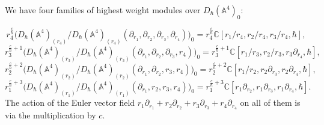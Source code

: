 \documentclass[12pt]{amsart}
\begin{document}
     
    We have four families of highest weight modules over $D_{\hbar}(\mathbb{A}^4)_0$:

\begin{equation*}
r_4^{\frac{c}{\hbar}}\Big(D_\hbar(\mathbb{A}^4)_{(r_4)}/D_\hbar(\mathbb{A}^4)_{(r_4)}(\partial_{r_1},\partial_{r_2},\partial_{r_3},\partial_{r_4})\Big)_0=r_4^{\frac{c}{\hbar}}\mathbb{C}[r_1/r_4,r_2/r_4,r_3/r_4,\hbar],
\end{equation*}
\begin{equation*}
r_3^{\frac{c}{\hbar}+1}\Big(D_\hbar(\mathbb{A}^4)_{(r_3)}/D_\hbar(\mathbb{A}^4)_{(r_3)}(\partial_{r_1},\partial_{r_2},\partial_{r_3},r_4)\Big)_0=r_3^{\frac{c}{\hbar}+1}\mathbb{C}[r_1/r_3,r_2/r_3,r_3\partial_{r_4},\hbar], 
\end{equation*}
\begin{equation*}
r_2^{\frac{c}{\hbar}+2}\Big(D_\hbar(\mathbb{A}^4)_{(r_2)}/D_\hbar(\mathbb{A}^4)_{(r_2)}(\partial_{r_1},\partial_{r_2},r_3,r_4)\Big)_0=r_2^{\frac{c}{\hbar}+2}\mathbb{C}[r_1/r_2,r_2\partial_{r_3},r_2\partial_{r_4},\hbar], 
\end{equation*}
\begin{equation*}
r_1^{\frac{c}{\hbar}+3}\Big(D_\hbar(\mathbb{A}^4)_{(r_1)}/D_\hbar(\mathbb{A}^4)_{(r_1)}(\partial_{r_1},r_2,r_3,r_4)\Big)_0=r_1^{\frac{c}{\hbar}+3}\mathbb{C}[r_1\partial_{r_2},r_1\partial_{r_3},r_1\partial_{r_4},\hbar].
\end{equation*}
The action of the Euler vector field $r_1\partial_{r_1}+r_2\partial_{r_2}+r_3\partial_{r_3}+r_4\partial_{r_4}$ on all of them is via the multiplication by $c$.
\end{document}
